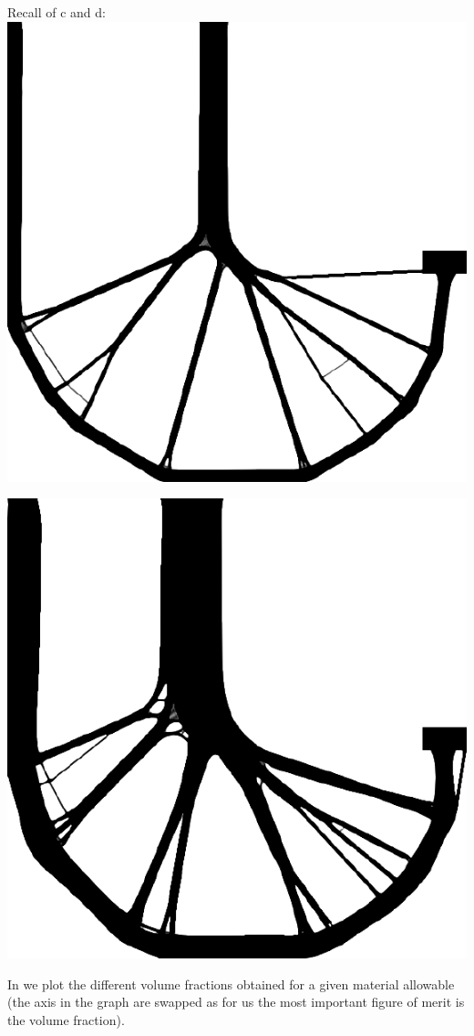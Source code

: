 \begin{marginfigure}
    Recall of c and d:
    \includegraphics[width=0.8\linewidth]{figures/03_comparison_TO_TTO/07_to_sol/fig0_0.4.pdf}
\end{marginfigure}
\begin{marginfigure}
    \includegraphics[width=0.8\linewidth]{figures/03_comparison_TO_TTO/07_to_sol/fig0_0.25.pdf}
\end{marginfigure}
In  we plot the different volume fractions obtained for a given material allowable (the axis in the graph are swapped as for us the most important figure of merit is the volume fraction).
